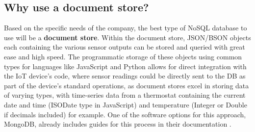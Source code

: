 \subsection{Why use a document store?}
Based on the specific needs of the company, the best type of NoSQL database to use will be a \textbf{document store}.
Within the document store, JSON/BSON objects each containing the various sensor outputs can be stored and queried with great ease and 
high speed. The programmatic storage of these objects using common types for languages like JavaScript and Python allows for direct 
integration with the IoT device's code, where sensor readings could be directly sent to the DB as part of the device's standard operations,
as document stores excel in storing data of varying types, with time-series data from a thermostat containing the current date and time 
(ISODate type in JavaScript) and temperature (Integer or Double if decimals included) for example. 
One of the software options for this approach, MongoDB, already includes guides for this process in their documentation
\autocite{mongodbModelIoTData}.


